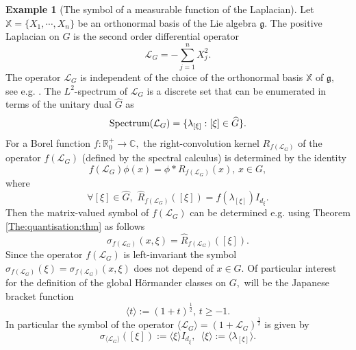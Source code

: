 \documentclass[12pt, reqno]{amsart}
\theoremstyle{definition}
\newtheorem{example}[theorem]{Example}
\theoremstyle{remark}
\numberwithin{equation}{section}
\begin{document}
\begin{example}[The symbol of a measurable function of the Laplacian] Let $\mathbb{X}=\{X_1,\cdots,X_n\}$ be an orthonormal basis of the Lie algebra $\mathfrak{g}.$ The positive Laplacian on $G$ is the second order differential operator 
\begin{equation}
    \mathcal{L}_G=-\sum_{j=1}^nX_j^2.
\end{equation}The operator $ \mathcal{L}_G$ is independent of the choice of the orthonormal basis $\mathbb{X}$ of $\mathfrak{g},$ see e.g. \cite{Ruz}. The $L^2$-spectrum of $\mathcal{L}_G$ is a discrete set that can be enumerated in terms of the unitary dual $\widehat{G}$ as
\begin{equation}
    \textnormal{Spectrum}(\mathcal{L}_G)=\{\lambda_{[\xi]}:[\xi]\in \widehat{G}\}.
\end{equation}For a Borel function $f:\mathbb{R}^+_0\rightarrow \mathbb{C},$ the right-convolution kernel $R_{f(\mathcal{L}_G)}$ of the operator $f(\mathcal{L}_G)$ (defined by the spectral calculus) is determined by the identity
\begin{equation}
    f(\mathcal{L}_G)\phi(x)=\phi\ast R_{f(\mathcal{L}_G)}(x),\,x\in G,
\end{equation}where
\begin{equation}
  \forall [\xi]\in \widehat{G},\,\,  \widehat{R}_{f(\mathcal{L}_G)}([\xi])=f(\lambda_{[\xi]})I_{d_\xi}.
\end{equation}Then the matrix-valued  symbol of $f(\mathcal{L}_G)$ can be determined e.g. using  Theorem \ref{The:quantisation:thm} as follows
\begin{equation}
    \sigma_{f(\mathcal{L}_G)}(x,\xi)=\widehat{R}_{f(\mathcal{L}_G)}([\xi]).
\end{equation}Since the operator $f(\mathcal{L}_G)$ is left-invariant the symbol  $\sigma_{f(\mathcal{L}_G)}(\xi)=\sigma_{f(\mathcal{L}_G)}(x,\xi)$ does not depend of  $x\in G.$ Of particular interest for the definition of the global H\"ormander classes on $G,$  will be the Japanese bracket function
\begin{equation}
    \langle t\rangle:=(1+t)^{\frac{1}{2}},\,t\geq -1.
\end{equation}In particular the symbol of the operator $ \langle \mathcal{L}_G\rangle=(1+\mathcal{L}_G)^{\frac{1}{2}}$ is given by
\begin{equation}\label{Japanne:bracket:G}
     \sigma_{\langle \mathcal{L}_G\rangle}([\xi]):= \langle \xi \rangle I_{d_\xi}, \,\,\,\langle \xi \rangle:=\langle \lambda_{[\xi]} \rangle.  
\end{equation}

    
\end{example}
\end{document}
